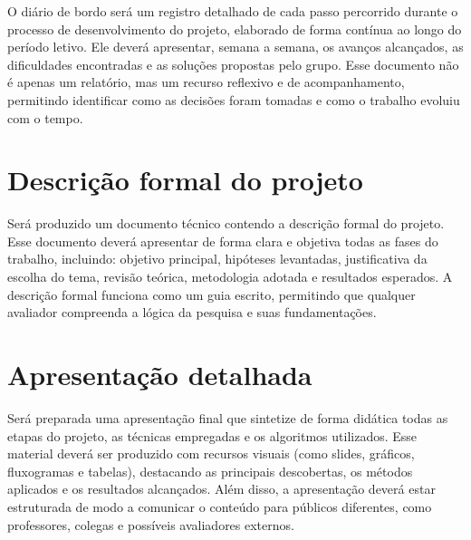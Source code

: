 O diário de bordo será um registro detalhado de cada passo percorrido durante o processo de desenvolvimento do projeto, elaborado de forma contínua ao longo do período letivo. Ele deverá apresentar, semana a semana, os avanços alcançados, as dificuldades encontradas e as soluções propostas pelo grupo. Esse documento não é apenas um relatório, mas um recurso reflexivo e de acompanhamento, permitindo identificar como as decisões foram tomadas e como o trabalho evoluiu com o tempo.

\section{Descrição formal do projeto}

Será produzido um documento técnico contendo a descrição formal do projeto. Esse documento deverá apresentar de forma clara e objetiva todas as fases do trabalho, incluindo: objetivo principal, hipóteses levantadas, justificativa da escolha do tema, revisão teórica, metodologia adotada e resultados esperados. A descrição formal funciona como um guia escrito, permitindo que qualquer avaliador compreenda a lógica da pesquisa e suas fundamentações.

\section{Apresentação detalhada}

Será preparada uma apresentação final que sintetize de forma didática todas as etapas do projeto, as técnicas empregadas e os algoritmos utilizados. Esse material deverá ser produzido com recursos visuais (como slides, gráficos, fluxogramas e tabelas), destacando as principais descobertas, os métodos aplicados e os resultados alcançados. Além disso, a apresentação deverá estar estruturada de modo a comunicar o conteúdo para públicos diferentes, como professores, colegas e possíveis avaliadores externos.